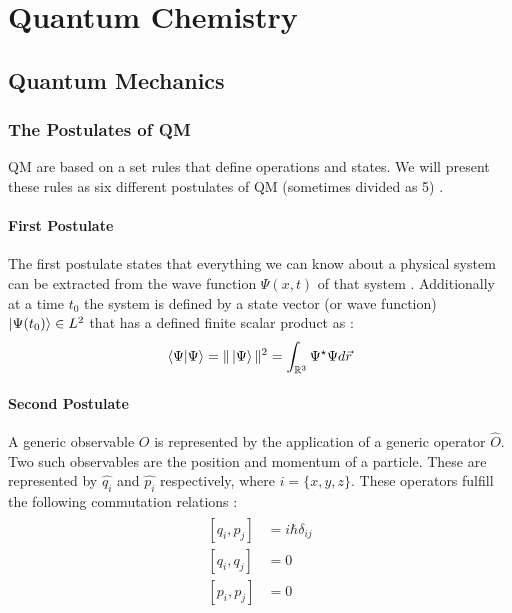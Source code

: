 \documentclass[../master_thesis.tex]{subfiles}
\begin{document}
\chapter{Quantum Chemistry}\label{chap:Quantum_chemistry}
\section{Quantum Mechanics}

\subsection{The Postulates of \ac{QM}}

\ac{QM} are based on a set rules that define operations and states. We will
present these rules as six different postulates of \ac{QM} (sometimes divided
as 5) \cite{Atkins:2011, Cohen:1973}.

\subsubsection{First Postulate}
The first postulate states that everything we can know about a physical system
can be extracted from the wave function $\Psi(x, t)$ of that system
\cite{Atkins:2011}. Additionally at a time $t_0$ the system is defined by
a state vector (or wave function) $\ket{\Psi(t_0)}\in L^2$ that has a defined
finite scalar product as \cite{Cohen:1973}:
\begin{equation}
  \braket{\Psi|\Psi} = \|\ket{\Psi}\|^2 =  \int_{\mathbb{R}^3}\Psi^\star\Psi d\vec{r}
\end{equation}

\subsubsection{Second Postulate}
A generic observable $O$ is represented by the application of a generic operator
$\hat{O}$. Two such observables are the position and momentum of a particle. These are
represented by $\hat{q_i}$ and $\hat{p_i}$ respectively, where
$i = \{x, y, z\}$. These operators fulfill the following commutation relations
\cite{Atkins:2011, Cohen:1973}:
\begin{align}
  \begin{split}
    [q_i, p_j] &= i \hbar \delta_{ij}\\
    [q_i, q_j] &= 0 \\
    [p_i, p_j] &= 0
  \end{split}
\end{align}
\end{document}
